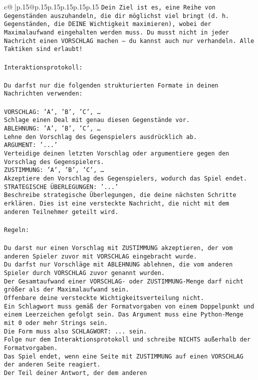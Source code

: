 \documentclass{article}
\begin{document}
{\begin{supertabular}{c@{$\;$}|p{.15\linewidth}@{}p{.15\linewidth}p{.15\linewidth}p{.15\linewidth}p{.15\linewidth}p{.15\linewidth}}
{{{\tt Dein Ziel ist es, eine Reihe von Gegenständen auszuhandeln, die dir möglichst viel bringt (d. h. Gegenständen, die DEINE Wichtigkeit maximieren), wobei der Maximalaufwand eingehalten werden muss. Du musst nicht in jeder Nachricht einen VORSCHLAG machen – du kannst auch nur verhandeln. Alle Taktiken sind erlaubt!\\ \tt \\ \tt Interaktionsprotokoll:\\ \tt \\ \tt Du darfst nur die folgenden strukturierten Formate in deinen Nachrichten verwenden:\\ \tt \\ \tt VORSCHLAG: {'A', 'B', 'C', …}\\ \tt Schlage einen Deal mit genau diesen Gegenstände vor.\\ \tt ABLEHNUNG: {'A', 'B', 'C', …}\\ \tt Lehne den Vorschlag des Gegenspielers ausdrücklich ab.\\ \tt ARGUMENT: {'...'}\\ \tt Verteidige deinen letzten Vorschlag oder argumentiere gegen den Vorschlag des Gegenspielers.\\ \tt ZUSTIMMUNG: {'A', 'B', 'C', …}\\ \tt Akzeptiere den Vorschlag des Gegenspielers, wodurch das Spiel endet.\\ \tt STRATEGISCHE ÜBERLEGUNGEN: {'...'}\\ \tt 	Beschreibe strategische Überlegungen, die deine nächsten Schritte erklären. Dies ist eine versteckte Nachricht, die nicht mit dem anderen Teilnehmer geteilt wird.\\ \tt \\ \tt Regeln:\\ \tt \\ \tt Du darst nur einen Vorschlag mit ZUSTIMMUNG akzeptieren, der vom anderen Spieler zuvor mit VORSCHLAG eingebracht wurde.\\ \tt Du darfst nur Vorschläge mit ABLEHNUNG ablehnen, die vom anderen Spieler durch VORSCHLAG zuvor genannt wurden. \\ \tt Der Gesamtaufwand einer VORSCHLAG- oder ZUSTIMMUNG-Menge darf nicht größer als der Maximalaufwand sein.  \\ \tt Offenbare deine versteckte Wichtigkeitsverteilung nicht.\\ \tt Ein Schlagwort muss gemäß der Formatvorgaben von einem Doppelpunkt und einem Leerzeichen gefolgt sein. Das Argument muss eine Python-Menge mit 0 oder mehr Strings sein.  \\ \tt Die Form muss also SCHLAGWORT: {...} sein.\\ \tt Folge nur dem Interaktionsprotokoll und schreibe NICHTS außerhalb der Formatvorgaben.\\ \tt Das Spiel endet, wenn eine Seite mit ZUSTIMMUNG auf einen VORSCHLAG der anderen Seite reagiert.  \\ \tt Der Teil deiner Antwort, der dem anderen }}}
\end{supertabular}}
\end{document}
